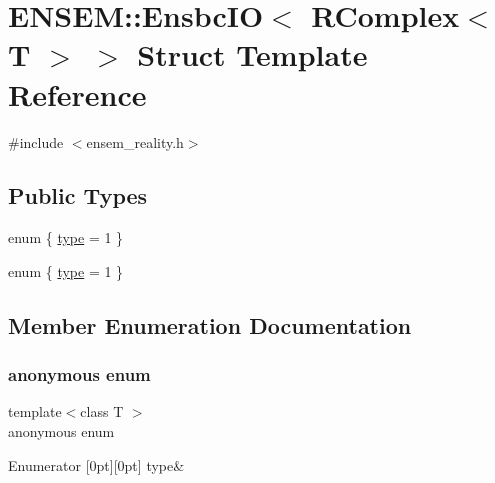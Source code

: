 \hypertarget{structENSEM_1_1EnsbcIO_3_01RComplex_3_01T_01_4_01_4}{}\section{E\+N\+S\+EM\+:\+:Ensbc\+IO$<$ R\+Complex$<$ T $>$ $>$ Struct Template Reference}
\label{structENSEM_1_1EnsbcIO_3_01RComplex_3_01T_01_4_01_4}


{\ttfamily \#include $<$ensem\+\_\+reality.\+h$>$}

\subsection*{Public Types}
\begin{DoxyCompactItemize}
\item 
enum \{ \mbox{\hyperlink{structENSEM_1_1EnsbcIO_3_01RComplex_3_01T_01_4_01_4_aff9ef4c8a5fd9ee825329a4a5f6a8cf0a5b3708c9fa3a312e76feca278f14a7d3}{type}} = 1
 \}
\item 
enum \{ \mbox{\hyperlink{structENSEM_1_1EnsbcIO_3_01RComplex_3_01T_01_4_01_4_aff9ef4c8a5fd9ee825329a4a5f6a8cf0a5b3708c9fa3a312e76feca278f14a7d3}{type}} = 1
 \}
\end{DoxyCompactItemize}


\subsection{Member Enumeration Documentation}
\mbox{\label{structENSEM_1_1EnsbcIO_3_01RComplex_3_01T_01_4_01_4_aff9ef4c8a5fd9ee825329a4a5f6a8cf0}} 
\subsubsection{\texorpdfstring{anonymous enum}{anonymous enum}}
{\footnotesize\ttfamily template$<$class T $>$ \\
anonymous enum}

\begin{DoxyEnumFields}{Enumerator}
[0pt][0pt]{}\mbox{\label{structENSEM_1_1EnsbcIO_3_01RComplex_3_01T_01_4_01_4_aff9ef4c8a5fd9ee825329a4a5f6a8cf0a5b3708c9fa3a312e76feca278f14a7d3}} 
type&\\
\hline

\end{DoxyEnumFields}
\mbox{\label{structENSEM_1_1EnsbcIO_3_01RComplex_3_01T_01_4_01_4_a0cbe3c6ab0e71cb9037d288e6b427266}} 
